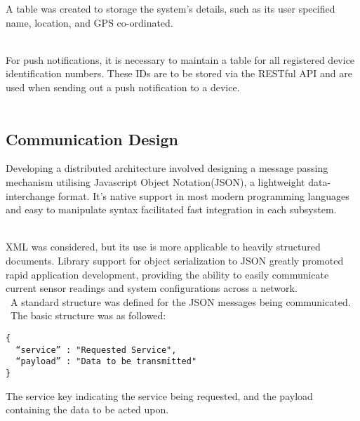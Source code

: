 \documentclass{article}
\begin{document}
A table was created to storage the system’s details, such as its user specified name, location, and GPS co-ordinated. \\\

For push notifications, it is necessary to maintain a table for all registered device identification numbers. These IDs are to be stored via the RESTful API and are used when sending out a push notification to a device. \\\

\subsection{Communication Design}
Developing a distributed architecture involved designing a message passing mechanism utilising Javascript Object Notation(JSON), a lightweight data-interchange format. It’s native support in most modern programming languages and easy to manipulate syntax facilitated fast integration in each subsystem. \\\

XML was considered, but its use is more applicable to heavily structured documents.  Library support for object serialization to JSON greatly promoted rapid application development, providing the ability to easily communicate current sensor readings and system configurations across a network. \\\ A standard structure was defined for the JSON messages being communicated. \\\ The basic structure was as followed: 
\begin{lstlisting}[caption={JSON Message Structure},label={lst:json_message}]
{ 
  “service” : "Requested Service",
  “payload” : "Data to be transmitted"
}
\end{lstlisting}

The service key indicating the service being requested, and the payload containing the data to be acted upon.
\end{document}
